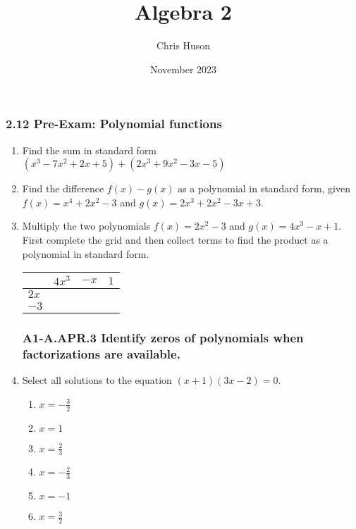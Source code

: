 \documentclass[12pt, twoside]{article}
\title{Algebra 2}
\author{Chris Huson}
\date{November 2023}
\begin{document}
\subsubsection*{2.12 Pre-Exam: Polynomial functions}
\begin{enumerate}

\subsubsection*{A1-A.APR.1 Add, subtract, and multiply polynomials}

\item Find the sum in standard form $(x^3-7x^2+2x+5)+(2x^3+9x^2-3x-5)$ \vspace{1.5cm}

\item Find the difference $f(x)-g(x)$ as a polynomial in standard form, given \\[0.25cm]
    $f(x)=x^4+2x^2-3$ and $g(x)=2x^3+2x^2-3x+3$. \vspace{2cm}

\item Multiply the two polynomials $f(x)=2x^2-3$ and $g(x)=4x^3-x+1$. First complete the grid and then collect terms to find the product as a polynomial in standard form. \\[0.25cm]
\renewcommand{\arraystretch}{2}
\begin{tabular}{|p{1cm}|p{3cm}|p{3cm}|p{3cm}|}
    \hline
     & $4x^3$ & $-x$ & $1$ \\
    \hline
    $2x$ &  & & \\
    \hline
    $-3$ &  & & \\
    \hline
\end{tabular} \vspace{3cm}

\subsubsection*{A1-A.APR.3 Identify zeros of polynomials when factorizations are available.}
\item Select all solutions to the equation $(x+1)(3x-2)=0$.
    \begin{multicols}{3}
    \begin{enumerate}
        \item $x= -\frac{3}{2}$
        \item $x= 1$
        \item $x=\frac{2}{3}$
        \item $x= -\frac{2}{3}$
        \item $x= -1$
        \item $x=\frac{3}{2}$
    \end{enumerate}
    \end{multicols}


\end{enumerate}
\end{document}
